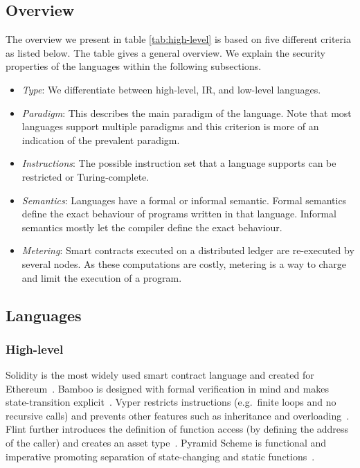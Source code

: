 \subsection{Overview}
The overview we present in table \ref{tab:high-level} is based on five different criteria as listed below. The table gives a general overview. We explain the security properties of the languages within the following subsections.
\begin{itemize}
\item \emph{Type}: We differentiate between high-level, IR, and low-level languages.
\item \emph{Paradigm}: This describes the main paradigm of the language. Note that most languages support multiple paradigms and this criterion is more of an indication of the prevalent paradigm.
\item \emph{Instructions}: The possible instruction set that a language supports can be restricted or Turing-complete.
\item \emph{Semantics}: Languages have a formal or informal semantic. Formal semantics define the exact behaviour of programs written in that language. Informal semantics mostly let the compiler define the exact behaviour.
\item \emph{Metering}: Smart contracts executed on a distributed ledger are re-executed by several nodes. As these computations are costly, metering is a way to charge and limit the execution of a program.
\end{itemize}



\subsection{Languages}

\subsubsection{High-level}
Solidity is the most widely used smart contract language and created for Ethereum~\cite{Ethereum2018Solidity}.
Bamboo is designed with formal verification in mind and makes state-transition explicit~\cite{Hirai2018Bamboo}. 
Vyper restricts instructions (e.g.\ finite loops and no recursive calls) and prevents other features such as inheritance and overloading~\cite{Ethereum2018Vyper}. 
Flint further introduces the definition of function access (by defining the address of the caller) and creates an asset type~\cite{Schrans2018}. 
Pyramid Scheme is functional and imperative promoting separation of state-changing and static functions~\cite{Burge2018}.

